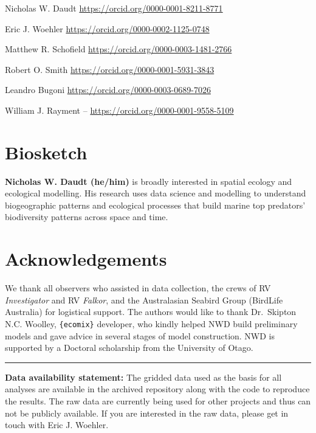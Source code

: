\documentclass{article}
\begin{document}
Nicholas W. Daudt \url{https://orcid.org/0000-0001-8211-8771}

Eric J. Woehler \url{https://orcid.org/0000-0002-1125-0748}

Matthew R. Schofield \url{https://orcid.org/0000-0003-1481-2766}

Robert O. Smith \url{https://orcid.org/0000-0001-5931-3843}

Leandro Bugoni \url{https://orcid.org/0000-0003-0689-7026}

William J. Rayment -- \url{https://orcid.org/0000-0001-9558-5109}

\hypertarget{biosketch}{%
\section*{Biosketch}\label{biosketch}}

\textbf{Nicholas W. Daudt (he/him)} is broadly interested in spatial ecology and ecological modelling. His research uses data science and modelling to understand biogeographic patterns and ecological processes that build marine top predators' biodiversity patterns across space and time.

\hypertarget{acknowledgements}{%
\section*{Acknowledgements}\label{acknowledgements}}

We thank all observers who assisted in data collection, the crews of RV \emph{Investigator} and RV \emph{Falkor}, and the Australasian Seabird Group (BirdLife Australia) for logistical support. The authors would like to thank Dr.~Skipton N.C. Woolley, \texttt{\{ecomix\}} developer, who kindly helped NWD build preliminary models and gave advice in several stages of model construction. NWD is supported by a Doctoral scholarship from the University of Otago.

\begin{center}\rule{0.5\linewidth}{0.5pt}\end{center}

\textbf{Data availability statement:} The gridded data used as the basis for all analyses are available in the archived repository along with the code to reproduce the results. The raw data are currently being used for other projects and thus can not be publicly available. If you are interested in the raw data, please get in touch with Eric J. Woehler.
\end{document}
